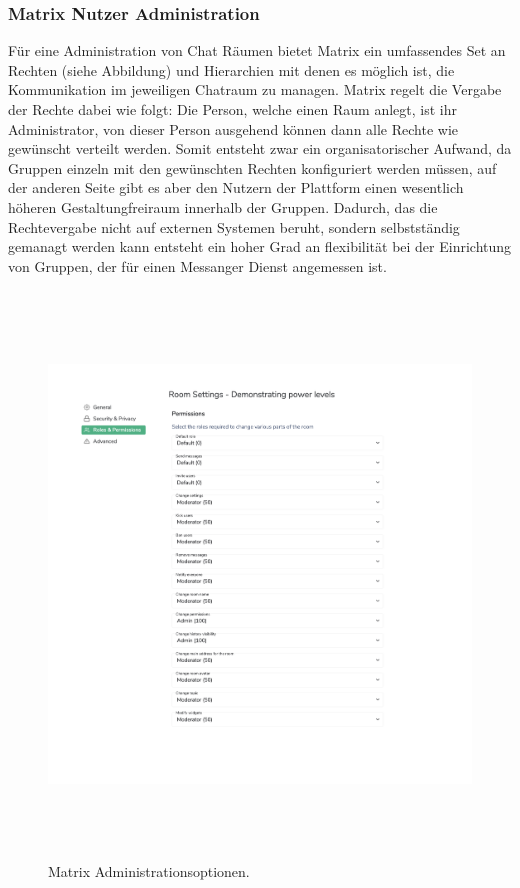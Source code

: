 \subsubsection{Matrix Nutzer Administration}\label{chapter:vdmf}
Für eine Administration von Chat Räumen bietet Matrix ein umfassendes Set an Rechten (siehe Abbildung) und Hierarchien mit denen es möglich ist, die Kommunikation im jeweiligen Chatraum zu managen. Matrix regelt die Vergabe der Rechte dabei wie folgt: Die Person, welche einen Raum anlegt, ist ihr Administrator, von dieser Person ausgehend können dann alle Rechte wie gewünscht verteilt werden. Somit entsteht zwar ein organisatorischer Aufwand, da Gruppen einzeln mit den gewünschten Rechten konfiguriert werden müssen, auf der anderen Seite gibt es aber den Nutzern der Plattform einen wesentlich höheren Gestaltungfreiraum innerhalb der Gruppen. Dadurch, das die Rechtevergabe nicht auf externen Systemen beruht, sondern selbstständig gemanagt werden kann entsteht ein hoher Grad an flexibilität bei der Einrichtung von Gruppen, der für einen Messanger Dienst angemessen ist.

\begin{figure}[htb]
    \centering
    \includegraphics[height=15cm]{graphics/moderation3.png}
    \caption[Matrix Administrationsoptionen]{Matrix Administrationsoptionen.\footnotemark}
    \label{abb:UI}
\end{figure}

